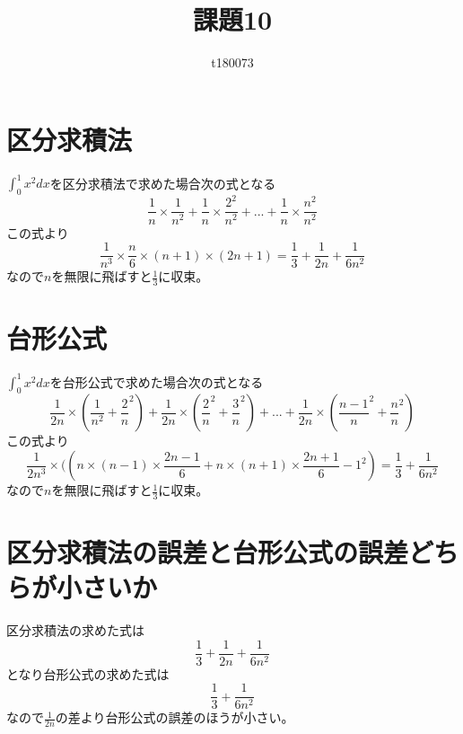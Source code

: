 \documentclass[dvipdfmx,autodetect-engine]{jsarticle}
\title{課題10}
\author{t180073}
\begin{document}
\maketitle

\section{区分求積法}
$\int_{0}^{1}x^{2}dx$を区分求積法で求めた場合次の式となる
\begin{equation}
    \frac{1}{n}\times\frac{1}{n^2}+\frac{1}{n}\times\frac{2^2}{n^2}+...+\frac{1}{n}\times\frac{n^2}{n^2}
\end{equation}
この式より
\begin{equation}
    \frac{1}{n^3}\times\frac{n}{6}\times(n+1)\times(2n+1)=\frac{1}{3}+\frac{1}{2n}+\frac{1}{6n^2}
\end{equation}
なので$n$を無限に飛ばすと$\frac{1}{3}$に収束。
\section{台形公式}
$\int_{0}^{1}x^{2}dx$を台形公式で求めた場合次の式となる
\begin{equation}
    \frac{1}{2n}\times(\frac{1}{n^2}+\frac{2}{n}^2)+\frac{1}{2n}\times(\frac{2}{n}^2+\frac{3}{n}^2)+...+\frac{1}{2n}\times(\frac{n-1}{n}^2+\frac{n}{n}^2)
\end{equation}
この式より
\begin{equation}
    \frac{1}{2n^3}\times((n\times(n-1)\times\frac{2n-1}{6}+n\times(n+1)\times\frac{2n+1}{6}-1^2)=\frac{1}{3}+\frac{1}{6n^2}
\end{equation}
なので$n$を無限に飛ばすと$\frac{1}{3}$に収束。
\section{区分求積法の誤差と台形公式の誤差どちらが小さいか}
区分求積法の求めた式は
\begin{equation}
    \frac{1}{3}+\frac{1}{2n}+\frac{1}{6n^2}
\end{equation}
となり台形公式の求めた式は
\begin{equation}
    \frac{1}{3}+\frac{1}{6n^2}
\end{equation}
なので$\frac{1}{2n}$の差より台形公式の誤差のほうが小さい。
\end{document}
